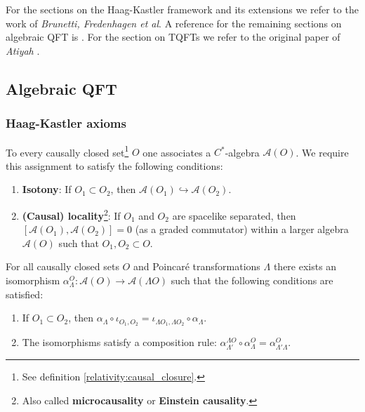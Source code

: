 \chapter{}

    For the sections on the Haag-Kastler framework and its extensions we refer to the work of \textit{Brunetti, Fredenhagen et al}. A reference for the remaining sections on algebraic QFT is \cite{baez_aqft}. For the section on TQFTs we refer to the original paper of \textit{Atiyah} \cite{atiyah}.

\section{Algebraic QFT}
\subsection{Haag-Kastler axioms}

    \begin{axiom}\label{qft:microcausality}
        To every causally closed set\footnote{See definition \ref{relativity:causal_closure}.} $O$ one associates a $C^*$-algebra $\mathcal{A}(O)$. We require this assignment to satisfy the following conditions:
        \begin{enumerate}
            \item \textbf{Isotony}: If $O_1\subset O_2$, then $\mathcal{A}(O_1)\hookrightarrow\mathcal{A}(O_2)$.
            \item \textbf{(Causal) locality}\footnote{Also called \textbf{microcausality} or \textbf{Einstein causality}.}: If $O_1$ and $O_2$ are spacelike separated, then $[\mathcal{A}(O_1),\mathcal{A}(O_2)] = 0$ (as a graded commutator) within a larger algebra $\mathcal{A}(O)$ such that $O_1, O_2\subset O$.
        \end{enumerate}
    \end{axiom}

    \begin{axiom}
        For all causally closed sets $O$ and Poincar\'e transformations $\Lambda$ there exists an isomorphism $\alpha^O_\Lambda:\mathcal{A}(O)\rightarrow\mathcal{A}(\Lambda O)$ such that the following conditions are satisfied:
        \begin{enumerate}
            \item If $O_1\subset O_2$, then $\alpha_\Lambda\circ\iota_{O_1,O_2} = \iota_{\Lambda O_1, \Lambda O_2}\circ\alpha_\Lambda$.
            \item The isomorphisms satisfy a composition rule: $\alpha^{\Lambda O}_{\Lambda'}\circ\alpha^O_\Lambda = \alpha^O_{\Lambda'\Lambda}$.
        \end{enumerate}
    \end{axiom}


